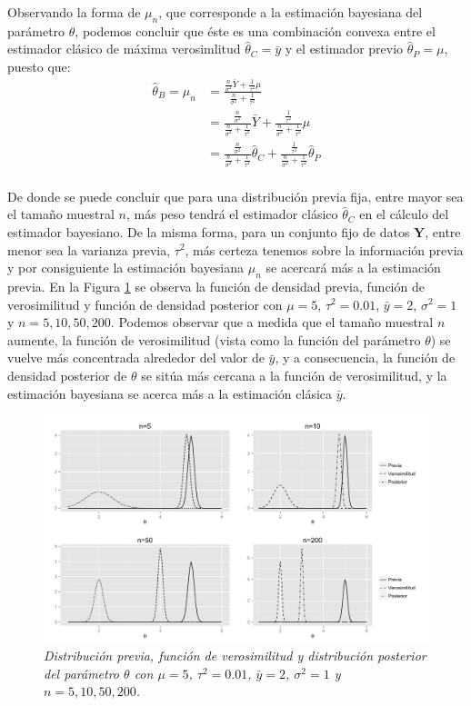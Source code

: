 \documentclass[10pt,openright]{book}\usepackage[]{graphicx}\usepackage[]{color}
\begin{document}
    Observando la forma de $\mu_n$, que corresponde a la estimaci\'on bayesiana del par\'ametro $\theta$, podemos concluir que \'este es una combinaci\'on convexa entre el estimador cl\'asico de m\'axima verosimlitud $\hat{\theta}_C=\bar{y}$ y el estimador previo $\hat{\theta}_P=\mu$, puesto que:
    \begin{align*}
    \hat{\theta}_B=\mu_n&=\frac{\frac{n}{\sigma^2}\bar{Y}+\frac{1}{\tau^2}\mu}{\frac{n}{\sigma^2}+\frac{1}{\tau^2}}\\
    &=\frac{\frac{n}{\sigma^2}}{\frac{n}{\sigma^2}+\frac{1}{\tau^2}}\bar{Y}+\frac{\frac{1}{\tau^2}}{\frac{n}{\sigma^2}+\frac{1}{\tau^2}}\mu\\
    &=\frac{\frac{n}{\sigma^2}}{\frac{n}{\sigma^2}+\frac{1}{\tau^2}}\hat{\theta}_C+\frac{\frac{1}{\tau^2}}{\frac{n}{\sigma^2}+\frac{1}{\tau^2}}\hat{\theta}_P\\
    \end{align*}
    
    De donde se puede concluir que para una distribuci\'on previa fija, entre mayor sea el tama\~no muestral $n$, m\'as peso tendr\'a el estimador cl\'asico $\hat{\theta}_C$ en el c\'alculo del estimador bayesiano. De la misma forma, para un conjunto fijo de datos $\mathbf{Y}$, entre menor sea la varianza previa, $\tau^2$, m\'as certeza tenemos sobre la informaci\'on previa y por consiguiente la estimaci\'on bayesiana $\mu_n$ se acercar\'a m\'as a la estimaci\'on previa. En la Figura \ref{compara_normal} se observa la funci\'on de densidad previa, funci\'on de verosimilitud y funci\'on de densidad posterior con $\mu=5$, $\tau^2=0.01$, $\bar{y}=2$, $\sigma^2=1$ y $n=5,10,50,200$. Podemos observar que a medida que el tama\~no muestral $n$ aumente, la funci\'on de verosimilitud (vista como la funci\'on del par\'ametro $\theta$) se vuelve m\'as concentrada alrededor del valor de $\bar{y}$, y a consecuencia, la funci\'on de densidad posterior de $\theta$ se sit\'ua m\'as cercana a la funci\'on de verosimilitud, y la estimaci\'on bayesiana se acerca m\'as a la estimaci\'on cl\'asica $\bar{y}$.
    
    \begin{figure}[!h]
    \centering
    \includegraphics[scale=0.57]{Comparacion_Normal.pdf}
    \caption{\emph{Distribuci\'on previa, funci\'on de verosimilitud y distribuci\'on posterior del par\'ametro $\theta$ con $\mu=5$, $\tau^2=0.01$, $\bar{y}=2$, $\sigma^2=1$ y $n=5,10,50,200$.}}
    \label{compara_normal}
    \end{figure}
    
\end{document}
